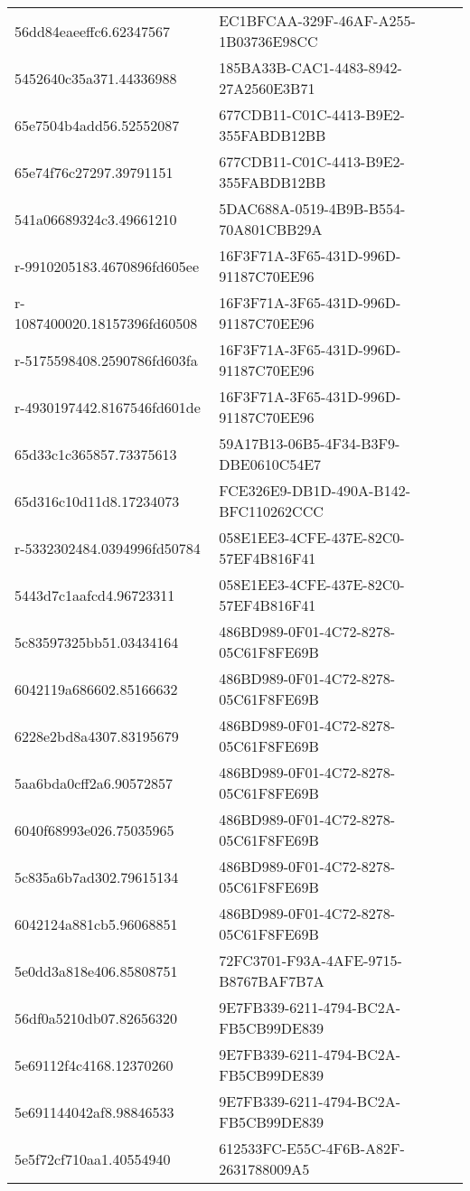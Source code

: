 \begin{tabular}{ll}
56dd84eaeeffc6.62347567 & EC1BFCAA-329F-46AF-A255-1B03736E98CC \\
5452640c35a371.44336988 & 185BA33B-CAC1-4483-8942-27A2560E3B71 \\
65e7504b4add56.52552087 & 677CDB11-C01C-4413-B9E2-355FABDB12BB \\
65e74f76c27297.39791151 & 677CDB11-C01C-4413-B9E2-355FABDB12BB \\
541a06689324c3.49661210 & 5DAC688A-0519-4B9B-B554-70A801CBB29A \\
r-9910205183.4670896fd605ee & 16F3F71A-3F65-431D-996D-91187C70EE96 \\
r-1087400020.18157396fd60508 & 16F3F71A-3F65-431D-996D-91187C70EE96 \\
r-5175598408.2590786fd603fa & 16F3F71A-3F65-431D-996D-91187C70EE96 \\
r-4930197442.8167546fd601de & 16F3F71A-3F65-431D-996D-91187C70EE96 \\
65d33c1c365857.73375613 & 59A17B13-06B5-4F34-B3F9-DBE0610C54E7 \\
65d316c10d11d8.17234073 & FCE326E9-DB1D-490A-B142-BFC110262CCC \\
r-5332302484.0394996fd50784 & 058E1EE3-4CFE-437E-82C0-57EF4B816F41 \\
5443d7c1aafcd4.96723311 & 058E1EE3-4CFE-437E-82C0-57EF4B816F41 \\
5c83597325bb51.03434164 & 486BD989-0F01-4C72-8278-05C61F8FE69B \\
6042119a686602.85166632 & 486BD989-0F01-4C72-8278-05C61F8FE69B \\
6228e2bd8a4307.83195679 & 486BD989-0F01-4C72-8278-05C61F8FE69B \\
5aa6bda0cff2a6.90572857 & 486BD989-0F01-4C72-8278-05C61F8FE69B \\
6040f68993e026.75035965 & 486BD989-0F01-4C72-8278-05C61F8FE69B \\
5c835a6b7ad302.79615134 & 486BD989-0F01-4C72-8278-05C61F8FE69B \\
6042124a881cb5.96068851 & 486BD989-0F01-4C72-8278-05C61F8FE69B \\
5e0dd3a818e406.85808751 & 72FC3701-F93A-4AFE-9715-B8767BAF7B7A \\
56df0a5210db07.82656320 & 9E7FB339-6211-4794-BC2A-FB5CB99DE839 \\
5e69112f4c4168.12370260 & 9E7FB339-6211-4794-BC2A-FB5CB99DE839 \\
5e691144042af8.98846533 & 9E7FB339-6211-4794-BC2A-FB5CB99DE839 \\
5e5f72cf710aa1.40554940 & 612533FC-E55C-4F6B-A82F-2631788009A5 \\

\end{tabular}
